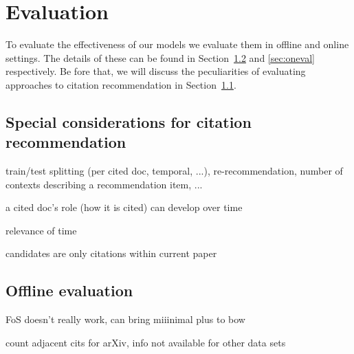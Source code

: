\chapter{Evaluation}\label{chap:evaluation}
To evaluate the effectiveness of our models we evaluate them in offline and online settings. The details of these can be found in Section~\ref{sec:offeval} and \ref{sec:oneval} respectively. Be fore that, we will discuss the peculiarities of evaluating approaches to citation recommendation in Section~\ref{sec:citrecspecial}.

\section{Special considerations for citation recommendation}\label{sec:citrecspecial}
train/test splitting (per cited doc, temporal, ...), re-recommendation, number of contexts describing a recommendation item, ...

a cited doc's role (how it is cited) can develop over time\cite{Swales1986,He2018}

relevance of time\cite{Beel2017a}

candidates are only citations within current paper\cite{Duma2014}

\section{Offline evaluation}\label{sec:offeval}

FoS doesn't really work, can bring miiinimal plus to bow

count adjacent cits for arXiv, info not available for other data sets





